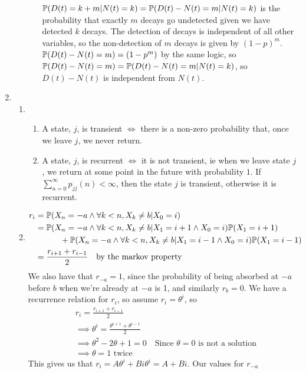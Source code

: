 \documentclass{article}
\begin{document}
\begin{enumerate}
\begin{enumerate}
\begin{enumerate}
$\mathbb{P} (D(t) = k+m | N(t) = k) = \mathbb{P}(D(t)-N(t)=m | N(t)=k)$ is the probability
that exactly $m$ decays go undetected given we have detected $k$ decays. The
detection of decays is independent of all other variables, so the non-detection
of $m$ decays is given by $(1-p)^m$. $\mathbb{P}(D(t)-N(t)=m)=(1-p^m)$ by the same
logic, so $\mathbb{P}(D(t)-N(t)=m)=\mathbb{P}(D(t)-N(t)=m|N(t)=k)$, so $D(t)-N(t)$ is
independent from $N(t)$.
\end{enumerate}
\end{enumerate}
\clearpage
\item 
\begin{enumerate}
\item
\begin{enumerate}
\item
A state, $j$, is transient $\iff$ there is a non-zero probability that, once we
leave $j$, we never return.
\item
A state, $j$, is recurrent $\iff$ it is not transient, ie when we leave state
$j$, we return at some point in the future with probability $1$. If
$\sum\limits_{n=0}^\infty p_{jj}(n) < \infty$, then the state $j$ is transient,
otherwise it is recurrent.
\end{enumerate}
\item
\begin{align*}
r_i &= \mathbb{P} (X_n = -a \wedge \forall k<n, X_k \neq b | X_0 = i)\\
&= \mathbb{P} (X_n = -a \wedge \forall k<n, X_k \neq b | X_1 = i+1 \wedge X_0 = i)\mathbb{P}
(X_1 = i+1) \\
& \quad \quad \quad + \mathbb{P}(X_n = -a \wedge \forall k<n, X_k \neq b | X_1 = i-1
\wedge X_0 = i)\mathbb{P} (X_1 = i-1)\\
&= \frac{r_{i+1} + r_{i-1}}{2} \quad \mbox{by the markov property}
\end{align*}
We also have that $r_{-a} = 1$, since the probability of being absorbed at $-a$
before $b$ when we're already at $-a$ is 1, and similarly $r_b=0$. We have a
recurrence relation for $r_i$, so assume $r_i = \theta^i$, so
\begin{align*}
& r_i = \frac{r_{i+1} + r_{i-1}}{2}\\
&\implies \theta^i = \frac{\theta^{i+1} + \theta^{i-1}}{2}\\
&\implies \theta^2-2\theta+1=0 \quad \mbox{Since $\theta = 0$ is not a
solution}\\
&\implies \theta = 1 \mbox { twice}
\end{align*}
This gives us that $r_i = A\theta^i +Bi\theta^i = A+Bi$. Our values for $r_{-a}$ 

\end{enumerate}
\end{enumerate}
\end{document}
